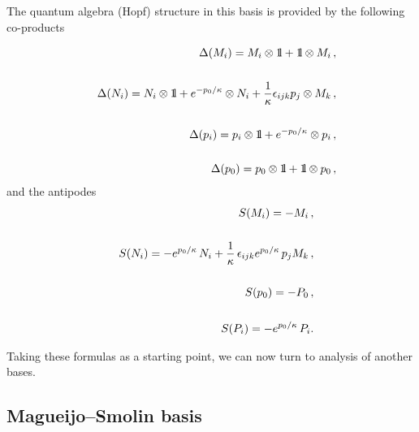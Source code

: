 \documentclass[a4paper,a4paper]{article}
\def\bbbone{{\mathchoice {\rm 1\mskip-4mu l} {\rm 1\mskip-4mu l}
{\rm 1\mskip-4.5mu l} {\rm 1\mskip-5mu l}}}
\begin{document}
The quantum algebra (Hopf) structure in this basis is provided by the following co-products



\begin{eqnarray}
\displaystyle
 && \Delta(M_{i}) = M_{i}\otimes \bbbone + \bbbone
\otimes M_{i}\, ,
\cr\cr
\displaystyle
&& \Delta(N_{i}) = N_{i}\otimes \bbbone  +
e^{-{p_{0}/ \kappa}}\otimes N_{i} + {1\over \kappa}
\epsilon_{ijk}p_{j}\otimes M_{k}\, ,
\cr\cr
\displaystyle
&& \Delta(p_{i}) = p_{i}\otimes \bbbone +
e^{-{p_{0}/ \kappa}} \otimes p_{i}\, ,
\cr\cr
\displaystyle
&& \Delta(p_{0}) = p_{0}\otimes \bbbone +  \bbbone \otimes p_{0}\, ,
\label{4}
\end{eqnarray}
and the antipodes
\begin{eqnarray} %
\displaystyle
 && S(M_{i}) = - M_{i}\, ,
\cr\cr \displaystyle && S(N_{i}) = -e^{{p_{0}/ \kappa}}\,
N_{i}+\frac1\kappa\, \epsilon_{ijk}e^{{p_{0}/ \kappa}}\,p_j M_k \,
, \cr\cr \displaystyle && S(p_{0}) = -P_{0}\, , \cr\cr
\displaystyle && S(P_{i}) = -e^{{p_{0}/ \kappa}}\, P_{i}.
\label{4a}
\end{eqnarray}

Taking these formulas as a starting point, we can now turn to analysis of another bases.

\subsection{Magueijo--Smolin basis}
\end{document}
